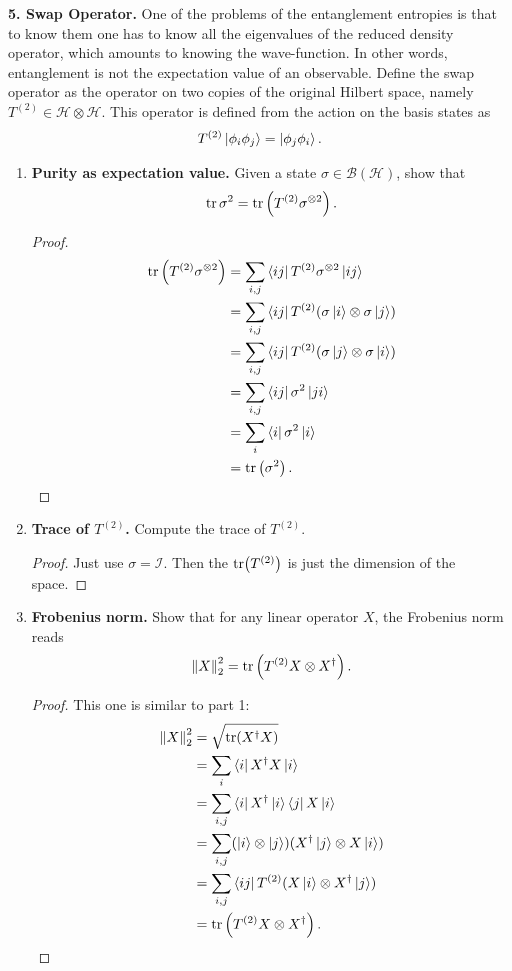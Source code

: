 \documentclass{book}
\theoremstyle{definition}
\newcommand{\nn}{\nonumber}
\newcommand{\had}{\mathcal{H}}
\newcommand{\lp}{\left(}
\newcommand{\rp}{\right)}
\newcommand{\Id}{\mathcal{I}}
\begin{document}
\noindent \textbf{5. Swap Operator.} One of the problems of the entanglement entropies is that to know them one has
to know all the eigenvalues of the reduced density operator, which amounts to
knowing the wave-function. In other words, entanglement is not the expectation
value of an observable. Define the swap operator as the operator on two copies of
the original Hilbert space, namely $T^{(2)} \in \had \otimes \had$. This operator is defined from the action on the basis states as
\begin{align}
T^{(2)} \ket{\phi_i \phi_j} = \ket{\phi_j \phi_i}.
\end{align}
\begin{enumerate}
	\item \textbf{Purity as expectation value.} Given a state $\sigma \in \mathcal{B}(\had)$, show that 
	\begin{align}
	\tr\sigma^2 = \tr\lp T^{(2)} \sigma^{\otimes 2} \rp.
	\end{align}
	
	\begin{proof}
		\begin{align}
		\tr\lp T^{(2)}\sigma^{\otimes 2} \rp &= \sum_{i,j} \bra{ij} T^{(2)}\sigma^{\otimes 2} \ket{ij}\nn\\
		&= \sum_{i,j} \bra{ij} T^{(2)} (\sigma \ket{i} \otimes \sigma\ket{j})\nn\\
		&= \sum_{i,j} \bra{ij} T^{(2)} (\sigma \ket{j} \otimes \sigma\ket{i})\nn\\
		&= \sum_{i,j} \bra{ij} \sigma^2 \ket{ji} \nn\\
		&= \sum_i \bra{i}\sigma^2 \ket{i}\nn\\
		&= \tr\lp \sigma^2 \rp.
		\end{align}
	\end{proof}
	
	\item \textbf{Trace of $T^{(2)}$.} Compute the trace of $T^{(2)}$.
	\begin{proof}
		Just use $\sigma = \Id$. Then the $\tr(T^{(2)})$ is just the dimension of the space.  
	\end{proof}
	
	\item \textbf{Frobenius norm.} Show that for any linear operator $X$, the Frobenius norm reads 
	\begin{align}
	\norm{X}_2^2 = \tr\lp T^{(2)} X \otimes X^\dagger \rp.
	\end{align}
	\begin{proof}
		This one is similar to part 1:
		\begin{align}
		\norm{X}_2^2 &= \sqrt{\tr(X^\dagger X)} \nn\\
		&= {\sum_i \bra{i} X^\dagger X \ket{i}}\nn\\
		&= {\sum_{i,j} \bra{i}X^\dagger \ket{i}\bra{j} X\ket{i}   }\nn\\
		&= \sum_{i,j} (\ket{i} \otimes \ket{j})(X^\dagger\ket{j} \otimes X\ket{i})\nn\\
		&= \sum_{i,j} \bra{ij}T^{(2)}( X\ket{i} \otimes X^\dagger\ket{j} )\nn\\
		&= \tr\lp T^{(2)} X \otimes X^\dagger \rp.
		\end{align}
	\end{proof}


\end{enumerate}
\end{document}
